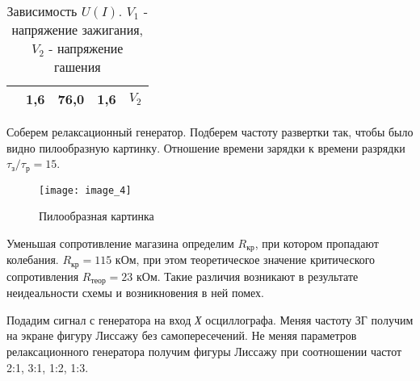 \begin{table}[!h]
\begin{minipage}[h]{0.5\linewidth}
\begin{tabular}{|cc|cc|c}
		\rowcolor[HTML]{B4C6E7} 
		\multicolumn{1}{|c|}{\cellcolor[HTML]{B4C6E7}84,2} & 1,6   & \multicolumn{1}{c|}{\cellcolor[HTML]{B4C6E7}76,0} & 1,6   & \multicolumn{1}{c|}{\cellcolor[HTML]{B4C6E7}$V_2$} \\ \hline
	\end{tabular}
	\caption{Зависимость $U(I)$. $V_1$ - напряжение зажигания, $V_2$ - напряжение гашения}
	\label{tab:table_1}
	\end{minipage}
	\begin{minipage}[h]{0.5\linewidth}
	\end{minipage}
\end{table}

Соберем релаксационный генератор. Подберем частоту развертки так, чтобы было видно пилообразную картинку.  Отношение времени зарядки к времени разрядки $\tau_{з}/\tau_{р} = 15$. 

\begin{figure}[h!]
	\centering
	\texttt{[image: image\_4]}
	\caption{Пилообразная картинка}
	\label{fig:image_4}
\end{figure}

Уменьшая сопротивление магазина определим $R_{кр}$, при котором пропадают колебания. $R_{кр} = 115$ кОм, при этом теоретическое значение критического сопротивления $R_\textit{теор} = 23$ кОм. Такие различия возникают в результате неидеальности схемы и возникновения в ней помех.

\newpage

Подадим сигнал с генератора на вход \textit{Х} осциллографа. Меняя частоту ЗГ получим на экране фигуру Лиссажу без самопересечений. Не меняя параметров релаксационного генератора получим фигуры Лиссажу при соотношении частот 2:1, 3:1, 1:2, 1:3.

\begin{figure}[!h]
	\begin{minipage}[h]{0.45\linewidth}
	\end{minipage}
\hfill
	\begin{minipage}[h]{0.45\linewidth}
	\end{minipage}
\vfill
	\begin{minipage}[h]{0.45\linewidth}
\end{minipage}
\hfill
\begin{minipage}[h]{0.45\linewidth}
\end{minipage}
\end{figure}

